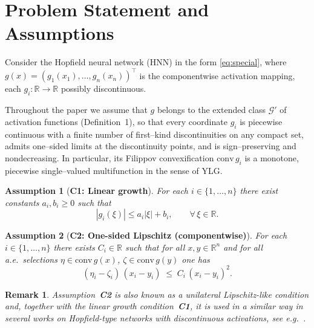 \documentclass[journal]{IEEEtran}
\newtheorem{assumption}{Assumption}
\newtheorem{remark}{Remark}
\begin{document}
\section{Problem Statement and Assumptions}\label{sec:problem}

Consider the Hopfield neural network (HNN) in the form \eqref{eq:special}, where $g(x)=(g_1(x_1),\ldots,g_n(x_n))^\top$ is the componentwise activation
mapping, each $g_i:\mathbb{R}\to\mathbb{R}$ possibly discontinuous.

Throughout the paper we assume that $g$ belongs to the extended class
$\mathcal G'$ of activation functions (Definition~1), so that every
coordinate $g_i$ is piecewise continuous with a finite number of
first–kind discontinuities on any compact set, admits one–sided limits
at the discontinuity points, and is sign–preserving and
nondecreasing.  In particular, its Filippov convexification
$\mathrm{conv}\,g_i$ is a monotone, piecewise single–valued
multifunction in the sense of YLG.

\begin{assumption}[\bf C1: Linear growth]\label{ass:C1}
For each $i\in\{1,\dots,n\}$ there exist constants $a_i,b_i\ge 0$ such
that
\[
  |g_i(\xi)| \le a_i|\xi| + b_i,
  \qquad \forall\,\xi\in\mathbb{R}.
\]
\end{assumption}

\begin{assumption}[\bf C2: One-sided Lipschitz (componentwise)]\label{ass:C2}
For each $i\in\{1,\dots,n\}$ there exists $C_i\in\mathbb{R}$ such that
for all $x,y\in\mathbb{R}^n$ and for all a.e.\ selections
$\eta\in\mathrm{conv}\,g(x)$, $\zeta\in\mathrm{conv}\,g(y)$ one has
\[
  (\eta_i - \zeta_i)\,(x_i - y_i)
  \;\le\; C_i\,(x_i - y_i)^2.
\]
\end{assumption}

\begin{remark}
Assumption~\textbf{C2} is also known as a \emph{unilateral
Lipschitz-like} condition and, together with the linear growth
condition~\textbf{C1}, it is used in a similar way in several works
on Hopfield-type networks with discontinuous activations,
see e.g.\ \cite{periodic_time_varying,eq_ref_11,unilateral_Lipschitz_like_condition,
GAS_of_delayed,GAS_discrete_time_varying}.
\end{remark}
\end{document}
